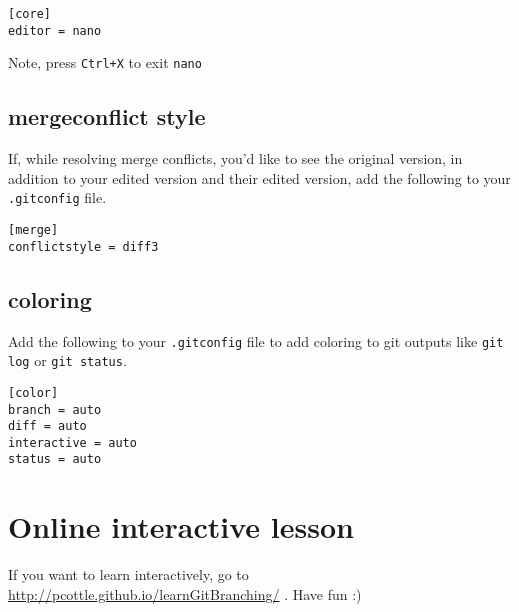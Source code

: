 \documentclass[12pt]{article}
\begin{document}
\texttt{[core]\\
editor = nano }

Note, press \texttt{Ctrl+X} to exit \texttt{nano}

\subsection{mergeconflict style}
If, while resolving merge conflicts, you'd like to see the original version, in addition to your edited version and their edited version, add the following to your \texttt{.gitconfig} file.

\texttt{[merge]\\
conflictstyle = diff3 }

\subsection{coloring}
Add the following to your \texttt{.gitconfig} file to add coloring to git outputs like \texttt{git log} or \texttt{git status}.

\texttt{[color]\\
  branch = auto\\
  diff = auto\\
  interactive = auto\\
  status = auto }

\section{Online interactive lesson}
If you want to learn interactively, go to \url{http://pcottle.github.io/learnGitBranching/} . Have fun :)
\end{document}
